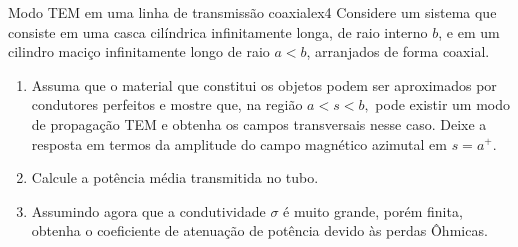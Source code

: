 \begin{exercício}{Modo TEM em uma linha de transmissão coaxial}{ex4}
    Considere um sistema que consiste em uma casca cilíndrica infinitamente longa, de raio interno \(b\), e em um cilindro maciço infinitamente longo de raio \(a < b\), arranjados de forma coaxial.
    \begin{enumerate}[label=(\alph*)]
        \item Assuma que o material que constitui os objetos podem ser aproximados por condutores perfeitos e mostre que, na região \(a < s < b,\) pode existir um modo de propagação TEM e obtenha os campos transversais nesse caso. Deixe a resposta em termos da amplitude do campo magnético azimutal em \(s = a^+\).
        \item Calcule a potência média transmitida no tubo.
        \item Assumindo agora que a condutividade \(\sigma\) é muito grande, porém finita, obtenha o coeficiente de atenuação de potência devido às perdas Ôhmicas.
    \end{enumerate}
\end{exercício}
